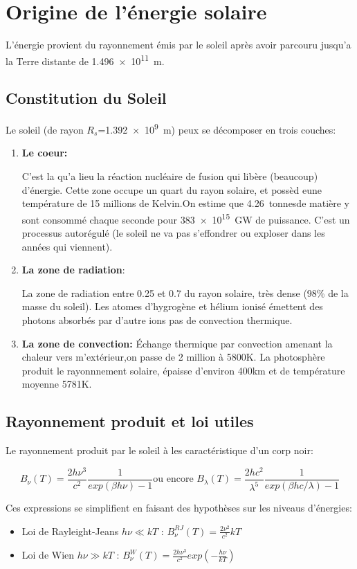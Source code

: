 \documentclass[main.tex]{subfiles}
\begin{document}
\section{Origine de l'énergie solaire}
L'énergie provient du rayonnement émis par le soleil après avoir
parcouru jusqu'a la Terre distante de \SI{1,496e11}{m}.
\subsection{Constitution du Soleil}
Le soleil (de rayon $R_s$=\SI{1,392e9}{m}) peux se décomposer en trois couches:


\begin{enumerate}
\item \textbf{Le coeur:}

  C'est la qu'a lieu la réaction nucléaire de fusion qui libère (beaucoup)
  d'énergie. Cette zone occupe un quart du rayon solaire, et possèd eune
  température de 15 millions de Kelvin.On estime que \SI{4.26}{tonnes}de matière y sont consommé chaque seconde pour  \SI{383e15}{GW} de puissance.
  C'est un processus autorégulé (le soleil ne va pas s'effondrer ou exploser
  dans les années qui viennent).

\item \textbf{La zone de radiation}:

La zone de radiation entre 0.25 et 0.7 du rayon solaire, très dense (98\% de la masse du soleil). Les atomes d'hygrogène et hélium ionisé émettent des photons absorbés par d'autre ions pas de convection thermique.
\item \textbf{La zone de convection:}
  Échange thermique par convection amenant la chaleur vers m'extérieur,on passe de 2 million à 5800K.
  La photosphère  produit le rayonnnement solaire, épaisse d'environ 400km et de température moyenne 5781K.
\end{enumerate}

\subsection{Rayonnement produit et loi utiles}

Le rayonnement produit par le soleil à les caractéristique d'un corp noir:

\[
  B_\nu(T) = \frac{2h\nu^3}{c^2} \frac{1}{exp(\beta h \nu)-1} \text{ou  encore }
  B_\lambda(T) = \frac{2hc^2}{\lambda^5} \frac{1}{exp(\beta h c/\lambda)-1}
\]

Ces expressions se simplifient en faisant des hypothèses sur les niveaus d'énergies:
\begin{itemize}
\item Loi de Rayleight-Jeans  $h\nu \ll kT $ : $B_\nu^{RJ}(T)=\frac{2\nu^2}{c^2}kT$
\item Loi de Wien $h\nu \gg kT$ : $B_\nu^W (T) = \frac{2h\nu^3}{c^2}exp(-\frac{h\nu}{kT})$
\end{itemize}
\end{document}
